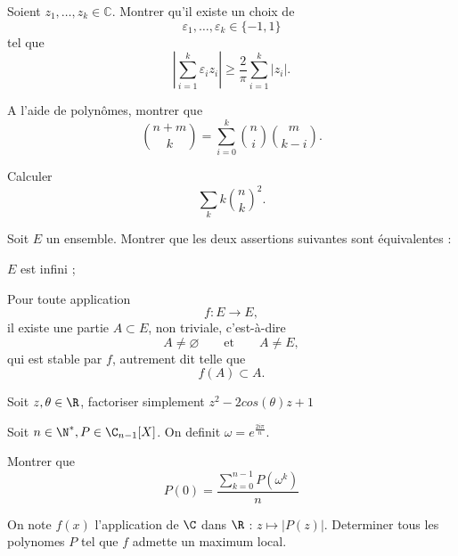 \documentclass[11pt,a4paper]{article}
\begin{document}
\begin{exercise}
Soient $z_1,\ldots,z_k\in\mathbb{C}$.
Montrer qu'il existe un choix de
\[
\varepsilon_1,\ldots,\varepsilon_k\in\{-1,1\}
\]
tel que
\[
\left|\sum_{i=1}^k \varepsilon_i z_i\right|
\geq
\frac{2}{\pi}\sum_{i=1}^k |z_i|.
\]
\end{exercise}

\begin{exercise}
\begin{questions}
    A l'aide de polynômes, montrer que
    \[
    \binom{n+m}{k}
    =
    \sum_{i=0}^k
    \binom{n}{i}
    \binom{m}{k-i}.
    \]
    \item Calculer
    \[
    \sum_k k\binom{n}{k}^2.
    \]
\end{questions}
\end{exercise}
\begin{exercise}
Soit $E$ un ensemble. Montrer que les deux assertions suivantes sont équivalentes :
\begin{questions}
    \item $E$ est infini ;
    \item Pour toute application
    \[
    f:E\to E,
    \]
    il existe une partie $A\subset E$, non triviale, c'est-à-dire
    \[
    A\neq\varnothing
    \qquad\text{et}\qquad
    A\neq E,
    \]
    qui est stable par $f$, autrement dit telle que
    \[
    f(A)\subset A.
    \]
\end{questions}
\end{exercise}

\begin{exercise}
Soit $z,\theta\in\R$, factoriser simplement $z^2-2cos(\theta)z+1$
\end{exercise}

\begin{exercise}
Soit $n\in \N^*, P\in \C_{n-1}[X]$.
On definit $\omega=e^{\frac{2i\pi}n}$.
\begin{questions}
\item Montrer que $$P(0)=\frac{\sum_{k=0}^{n-1}P(\omega^k)}n$$

\item On note $f(x)$ l'application de $\C$ dans $\R$ : $z\mapsto|P(z)|$.
Determiner tous les polynomes $P$ tel que $f$ admette un maximum local. 
\end{questions}
\end{exercise}
\end{document}
